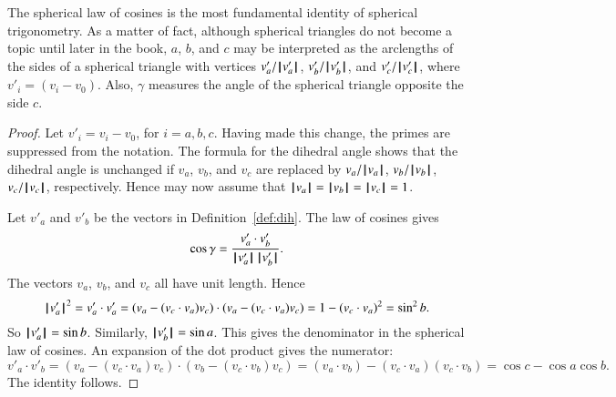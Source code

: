 The spherical law of cosines is the most fundamental identity of spherical trigonometry.   As a matter of fact, although  spherical
triangles do not become a topic until later in the book, $a$, $b$, and $c$ may be interpreted as
the arclengths of the sides of a spherical triangle with
vertices $v'_a/\normo{v'_a}$, $v'_b/\normo{v'_b}$, and $v'_c/\normo{v'_c}$,
where $v'_i = (v_i-v_0)$.  Also,
$\gamma$ measures the angle of the spherical triangle opposite the
side $c$.


\begin{proof}  Let $v'_i = v_i - v_0$, for $i=a,b,c$.  Having
made this change,  the primes are suppressed from the notation.
The formula for the dihedral angle shows that the
dihedral angle is unchanged if $v_a$, $v_b$, and $v_c$ are replaced
by $v_a/\normo{v_a}$, $v_b/\normo{v_b}$, $v_c/\normo{v_c}$, respectively.  Hence
may now assume that $\normo{v_a}=\normo{v_b}=\normo{v_c}=1$.

Let $v'_a$ and $v'_b$ be the vectors in Definition~\ref{def:dih}.
The law of cosines gives
        $$\cos\gamma = \frac{v'_a\cdot v'_b}{\normo{v'_a}\,\normo{v'_b}}.$$
The vectors $v_a$, $v_b$, and $v_c$ all have unit length.  Hence
        $$
        \normo{v'_a}^2 = v'_a\cdot v'_a =
        (v_a - (v_c\cdot v_a)v_c)\cdot (v_a - (v_c\cdot v_a) v_c) =
        1 - (v_c\cdot v_a)^2 = \sin^2 b.
        $$
So $\normo{v'_a} =\sin b$. Similarly, $\normo{v'_b} = \sin a$.  This gives
the denominator in the spherical law of cosines.  An expansion of the dot product
gives the numerator:
    $$
    v'_a\cdot v'_b = (v_a - (v_c\cdot v_a) v_c)\cdot (v_b - (v_c\cdot v_b) v_c)
    = (v_a\cdot v_b) - (v_c\cdot v_a) (v_c\cdot v_b) = \cos c - \cos
    a \cos b.
    $$
The identity follows.
\end{proof}

